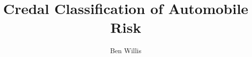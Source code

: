 \documentclass[11pt]{report}
\begin{document}
\title{Credal Classification of Automobile Risk}
\author{Ben Willis}
\maketitle

\tableofcontents





\end{document}
